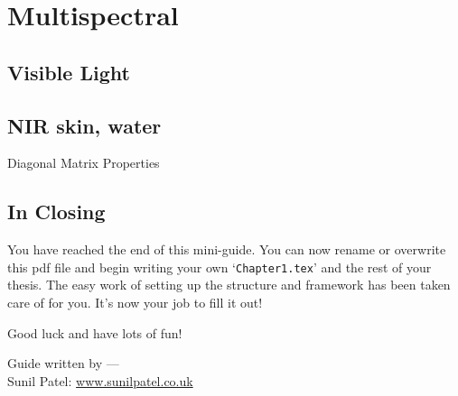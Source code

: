 \chapter{Multispectral} %

\label{Chapter6} %


\section{Visible Light}
\section{NIR skin, water}

\begin{compactitem}

\item Diagonal Matrix Properties
\end{compactitem}


\section{In Closing}

You have reached the end of this mini-guide. You can now rename or overwrite this pdf file and begin writing your own `\texttt{Chapter1.tex}' and the rest of your thesis. The easy work of setting up the structure and framework has been taken care of for you. It's now your job to fill it out!

Good luck and have lots of fun!

\begin{flushright}
Guide written by ---\\
Sunil Patel: \href{http://www.sunilpatel.co.uk}{www.sunilpatel.co.uk}
\end{flushright}
